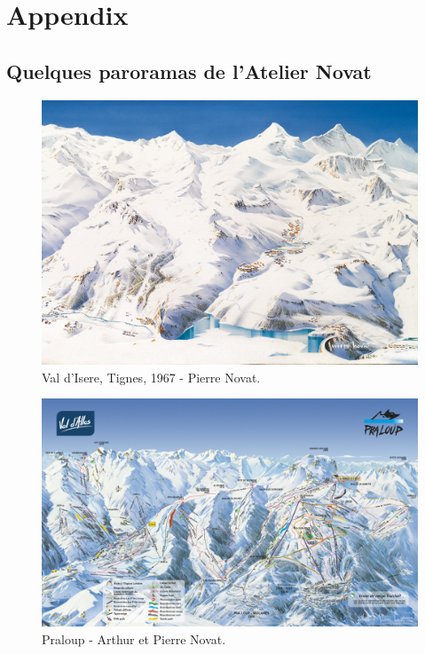 \appendix \chapter{Appendix} 

\section{Quelques paroramas de l'Atelier Novat}


\begin{figure}[h!]

   \centering
   \includegraphics[width=1.0\linewidth]{novat/Val_Isere.jpg}
   \caption{Val d'Isere, Tignes, 1967 - Pierre Novat.}
\end{figure}

\begin{figure}[h!]

   \centering
   \includegraphics[width=1.0\linewidth]{novat/praloup.jpg}
   \caption{Praloup - Arthur et Pierre Novat.}
\end{figure}

